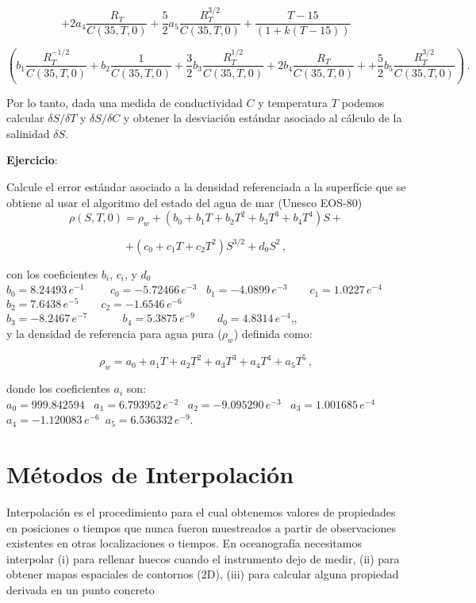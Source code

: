 \documentclass[
]{agujournal2019}
\begin{document}
\[+2 a_4 \frac{R_T}{C(35,T,0)} +\frac{5}{2} a_5 \frac{R_T^{3/2}}{C(35,T,0)}+\frac{T-15}{(1+k(T-15))}\]

\[\left(b_1 \frac{R_T^{-1/2}}{C(35,T,0)} +
         b_2 \frac{1}{C(35,T,0)} +
             \frac{3}{2}b_3 \frac{R_T^{1/2}}{C(35,T,0)}+
               2 b_4 \frac{R_T}{C(35,T,0)} +
     +\frac{5}{2} b_5 \frac{R_T^{3/2}}{C(35,T,0)}
     \right)\,.\]

\noindent Por lo tanto, dada una medida de conductividad \(C\) y
temperatura \(T\) podemos calcular \({\delta{S}}/{\delta{T}}\) y
\({\delta{S}}/{\delta{C}}\) y obtener la desviación estándar asociado al
cálculo de la salinidad \(\delta{S}\).

\textbf{Ejercicio}:

Calcule el error estándar asociado a la densidad referenciada a la
superfície que se obtiene al usar el algoritmo del estado del agua de
mar (Unesco EOS-80)
\[\rho(S,T,0)=\rho_w + \left(b_0+b_1 T+b_2 T^2+b_3 T^{3}+b_4 T^{4}\right) S +\]

\[+\left(c_0+c_1 T+c_2 T^2\right) S^{3/2} + d_0 S^2\,,\]

con los coeficientes \(b_i\), \(c_i\), y \(d_0\)\\
\(b_0=8.24493\,e^{-1}\,\,\,\,\,\,\,\,\,\,\,\,\,\,c_0=-5.72466\,e^{-3}\)
~\(b_1=-4.0899\,e^{-3}\,\,\,\,\,\,\,\,\,\,\,\,c_1=1.0227\,e^{-4}\)\\
\(b_2=7.6438\,e^{-5}\,\,\,\,\,\,\,\,\,\,\,\,c_2=-1.6546\,e^{-6}\)\\
\(b_3=-8.2467\,e^{-7}\,\,\,\,\,\,\,\,\,\,\,\,\) ~
\(b_4=5.3875\,e^{-9}\,\,\,\,\,\,\,\,\,\,\,\,d_0=4.8314\,e^{-4}\),,\\

y la densidad de referencia para agua pura (\(\rho_w\)) definida como:

\[\rho_w=a_0+a_1 T+a_2 T^2+a_3 T^{3}+a_4 T^{4}+a_5 T^{5}\,,\]

donde los coeficientes \(a_i\) son:\\
\(a_0=999.842594\) ~\(a_1=6.793952\,e^{-2}\) ~\(a_2=-9.095290\,e^{-3}\)
~\(a_3=1.001685\,e^{-4}\)
~\(a_4=-1.120083\,e^{-6}\)~\(a_5=6.536332\,e^{-9}\).

\hypertarget{muxe9todos-de-interpolaciuxf3n}{%
\section{Métodos de
Interpolación}\label{muxe9todos-de-interpolaciuxf3n}}

Interpolación es el procedimiento para el cual obtenemos valores de
propiedades en posiciones o tiempos que nunca fueron muestreados a
partir de observaciones existentes en otras localizaciones o tiempos. En
oceanografía necesitamos interpolar (i) para rellenar huecos cuando el
instrumento dejo de medir, (ii) para obtener mapas espaciales de
contornos (2D), (iii) para calcular alguna propiedad derivada en un
punto concreto
\end{document}
